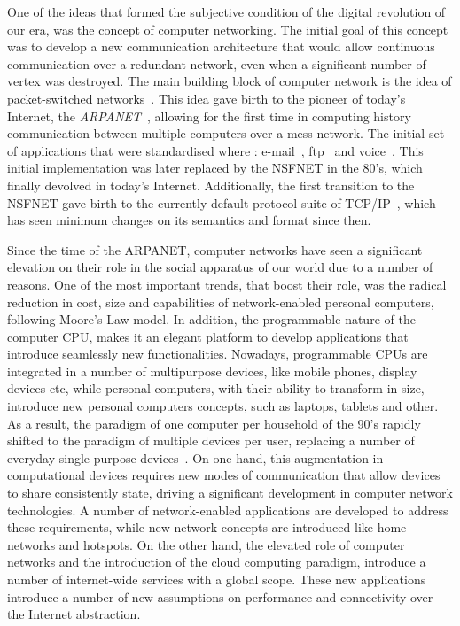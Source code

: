 One of the ideas that formed the subjective condition of the digital revolution
of our era, was the concept of computer networking. The initial goal of this
concept was to develop a new communication architecture that would allow
continuous communication over a redundant network, even when a significant
number of vertex was destroyed.  The main building block of computer network is
the idea of packet-switched networks~\cite{Licklider1963}.  This idea gave birth
to the pioneer of today's Internet, the {\it ARPANET}~\cite{Mills:1987tt},
allowing for the first time in computing history communication between multiple
computers over a mess network. The initial set of applications
that were standardised where : e-mail~\cite{RFC0561},
ftp~\cite{RFC0354} and voice~\cite{RFC0741}. This initial implementation was
later replaced by the NSFNET in the 80's, which finally devolved in today's
Internet. Additionally, the first transition to the NSFNET gave birth to the 
currently default protocol suite of TCP/IP~\cite{Clark:1988}, which has
seen minimum changes on its semantics and format since then.

Since the time of the ARPANET, computer networks have seen a significant
elevation on their role in the social apparatus of our world due to a number of
reasons. One of the most important trends, that boost their role, was the radical
reduction in cost, size and capabilities of network-enabled personal
computers, following Moore's Law model. In addition, the programmable nature of
the computer CPU, makes it an elegant platform to develop applications that
introduce seamlessly new functionalities. Nowadays, programmable CPUs are
integrated in a number of multipurpose devices, like mobile phones, display
devices etc, while personal computers, with their ability to transform in size,
introduce new personal computers concepts, such as laptops, tablets and other.
As a result, the paradigm of one computer per household of the 90's rapidly
shifted to the paradigm of multiple devices per user, replacing
a number of everyday single-purpose devices~\cite{Dholakia:2006vn}.  On one hand, this
augmentation in computational devices requires new modes of communication that
allow devices to share consistently state, driving a significant development in
computer network technologies. A number of network-enabled applications are
developed to address these requirements, while new network concepts are
introduced like home networks and hotspots. On the other hand, the elevated role
of computer networks and the introduction of the cloud computing paradigm,
introduce a number of internet-wide services with a global scope. These new
applications introduce a number of new assumptions on performance and connectivity
over the Internet abstraction. 


